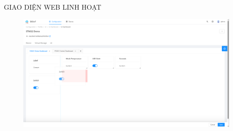 \begin{frame}{GIAO DIỆN WEB LINH HOẠT}
    \begin{figure}
    	\centering
    	\includegraphics[width=1.0\textwidth,height=0.8\textheight]{pic/fig-config-ui-tab-edit-mode.png}
    \end{figure}
\end{frame}

